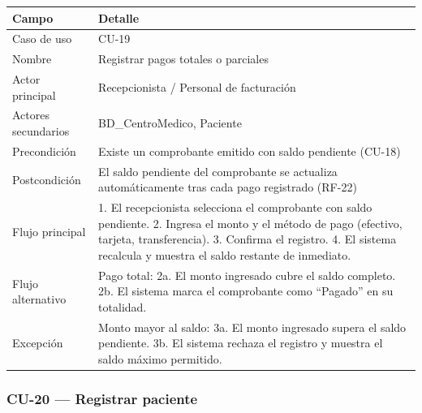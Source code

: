 \documentclass[11pt,a4paper]{article}
\begin{document}
	\begin{longtable}{p{} p{} }
		
		
		\toprule
		\textbf{Campo} &
		\textbf{Detalle}  \\
		\midrule
		\endhead
		
		Caso de uso & CU-19 \\
		Nombre & Registrar pagos totales o parciales \\
		Actor principal & Recepcionista / Personal de facturación \\
		Actores secundarios & BD\_CentroMedico, Paciente \\
		Precondición & Existe un comprobante emitido con saldo pendiente (CU-18) \\
		Postcondición & El saldo pendiente del comprobante se actualiza automáticamente tras cada pago registrado (RF-22) \\
		Flujo principal & 1. El recepcionista selecciona el comprobante con saldo pendiente. 2. Ingresa el monto y el método de pago (efectivo, tarjeta, transferencia). 3. Confirma el registro. 4. El sistema recalcula y muestra el saldo restante de inmediato. \\
		Flujo alternativo & Pago total: 2a. El monto ingresado cubre el saldo completo. 2b. El sistema marca el comprobante como ``Pagado'' en su totalidad. \\
		Excepción & Monto mayor al saldo: 3a. El monto ingresado supera el saldo pendiente. 3b. El sistema rechaza el registro y muestra el saldo máximo permitido. \\
		\bottomrule
	\end{longtable}
	
	
	\subsubsection{CU-20 --- Registrar paciente}
	
\end{document}
